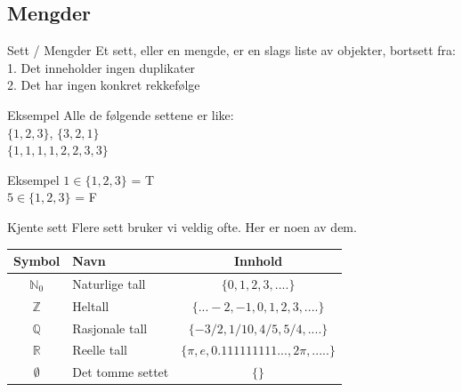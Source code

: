 \subsection{Mengder}
\begin{frame}{Sett / Mengder}
    Et sett, eller en mengde, er en slags liste av objekter, bortsett fra:\\
    \indent \hspace{3mm}    1. Det inneholder ingen duplikater\\
    \indent \hspace{3mm}    2. Det har ingen konkret rekkefølge
    
    \pause
    \begin{block}{Eksempel}
        Alle de følgende settene er like: \\
        $\{1, 2, 3\}$, $\{3, 2, 1\}$ \\
        $\{1, 1, 1, 1, 2, 2, 3, 3\}$
    \end{block}
    
    \pause
    \begin{block}{Eksempel}
        $1 \in \{1, 2, 3\}$ = T \\
        $5 \in \{1, 2, 3\}$ = F
    \end{block}
\end{frame}


\begin{frame}{Kjente sett}
    Flere sett bruker vi veldig ofte. Her er noen av dem.\\
    
    \begin{tabular}{c|l|c}
        Symbol & Navn & Innhold \\ \hline
        $\mathbb{N}_0$ & Naturlige tall & $\{0, 1, 2, 3, ....\}$\\
        $\mathbb{Z}$ & Heltall & $\{... -2, -1, 0, 1, 2, 3, ....\}$\\
        $\mathbb{Q}$ & Rasjonale tall & $\{-3/2, 1/10, 4/5, 5/4, ....\}$\\
        $\mathbb{R}$ & Reelle tall & $\{\pi, e, 0.111111111..., 2\pi, .....\}$\\
        $\emptyset$ & Det tomme settet & $\{\}$
    \end{tabular}
    
\end{frame}

